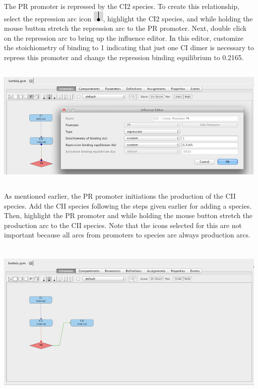 \documentclass[titlepage,11pt]{article}
\begin{document}
The PR promoter is repressed by the CI2 species.  To create this relationship, select the repression arc icon 
\includegraphics{../gui/icons/modelview/inhibition_selected}, highlight the CI2 species, and while holding the mouse button stretch the repression arc to the PR promoter.  Next, double click on the repression arc to bring up the influence editor.  In this editor, customize the stoichiometry of binding to 1 indicating that just one CI dimer is necessary to repress this promoter and change the repression binding equilibrium to 0.2165.

\begin{center}
\includegraphics[height=60mm]{screenshots/repression} 
\end{center}

As mentioned earlier, the PR promoter initiations the production of the CII species.  Add the CII species following the steps given earlier for adding a species.  Then, highlight the PR promoter and while holding the mouse button stretch the production arc to the CII species.  Note that the icons selected for this are not important because all arcs from promoters to species are always production arcs.

\begin{center}
\includegraphics[height=80mm]{screenshots/production}
\end{center}
\end{document}
